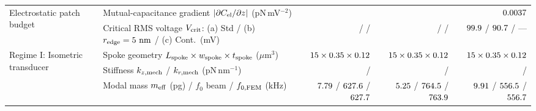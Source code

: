 \begin{table}[!htbp]
{\begin{tabular}{llrrr}
\midrule
\multirow{2}{*}{Electrostatic patch budget} 
 & Mutual-capacitance gradient $|\partial C_{\rm el}/\partial z|$ (pN\,mV$^{-2}$) & \NatureCantorNtwoHybridrzPatchPotentialAbsDcDzPnPerMvtwo{} & \NatureRotCeightCompactNtwoPatchPotentialAbsDcDzPnPerMvtwo{} & $\roundfour{\NatureFthreeOneoneoneAbsDcDzPnPerMvtwo}$ \\
 & Critical RMS voltage $V_{\rm crit}$: (a) Std / (b) $r_{\rm edge}=5\text{ nm}$ / (c) Cont.\ (mV) & \NatureCantorNtwoHybridrzPatchPotentialVCritMv{} / \NatureCantorNtwoHybridrzDiscretizationPullInBoundsRfiveUltraVCritMv{} / \NatureCantorNtwoHybridrzDiscretizationPullInBoundsContinuumVCritMv{} & \NatureRotCeightCompactNtwoPatchPotentialVCritMv{} / \NatureRotCeightCompactNtwoDiscretizationPullInBoundsRfiveUltraVCritMv{} / \NatureRotCeightCompactNtwoDiscretizationPullInBoundsContinuumVCritMv{} & $\roundone{\NatureFthreeOneoneoneVCritMv}$ / $\roundone{\NatureFthreeOneoneoneVCritRfivenmMv}$ / --- \\
\midrule
\multirow{7}{*}{Regime I: Isometric transducer} 
 & Spoke geometry $L_{\rm spoke} \times w_{\rm spoke} \times t_{\rm spoke}$ ($\mu$m$^3$) & $15{} \times 0.35{} \times 0.12{}$ & $15{} \times 0.35{} \times 0.12{}$ & $15{} \times 0.35{} \times 0.12{}$ \\
 & Stiffness $k_{z,\rm mech}$ / $k_{r,\rm mech}$ (pN\,nm$^{-1}$) & \NatureRotCeightCompactNtwoLateralStabilityKZMechPnPerNm{} / \NatureRotCeightCompactNtwoLateralStabilityKRMechPnPerNm{} & \NatureRotCeightCompactNtwoLateralStabilityKZMechPnPerNm{} / \NatureRotCeightCompactNtwoLateralStabilityKRMechPnPerNm{} & \NatureRotCeightCompactNtwoLateralStabilityKZMechPnPerNm{} / \NatureRotCeightCompactNtwoLateralStabilityKRMechPnPerNm{} \\
 & Modal mass $m_{\rm eff}$ (pg) / $f_0$ beam / $f_{0,\rm FEM}$ (kHz) & $\roundtwo{\NatureCantorNtwoHybridrzMEffRegonePg}$ / $\roundone{\NatureCantorNtwoHybridrzResFreqKhz}$ / $\roundone{\NatureCantorNtwoHybridrzFemFreqRegoneKhz}$ & $\roundtwo{\NatureRotCeightCompactNtwoMEffRegonePg}$ / $\roundone{\NatureRotCeightCompactNtwoResFreqKhz}$ / $\roundone{\NatureRotCeightCompactNtwoFemFreqRegoneKhz}$ & $\roundtwo{\NatureFthreeOneoneoneMEffRegonePg}$ / $\roundone{\NatureFthreeOneoneoneFZeroRegoneKhz}$ / $\roundone{\NatureFthreeOneoneoneFemFreqRegoneKhz}$ \\

\end{tabular}}
\end{table}

